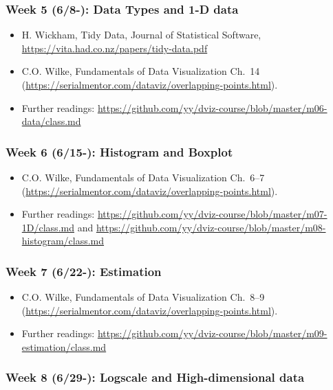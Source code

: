 \documentclass[11pt,article,oneside]{memoir} %
\begin{document}
\subsubsection{Week 5 (6/8-): Data Types and 1-D data } %

\begin{itemize}\itemsep0em 
\item H. Wickham, Tidy Data, Journal of Statistical Software, \url{https://vita.had.co.nz/papers/tidy-data.pdf}
\item C.O. Wilke, Fundamentals of Data Visualization Ch.~14 (\url{https://serialmentor.com/dataviz/overlapping-points.html}). 
\item Further readings: \url{https://github.com/yy/dviz-course/blob/master/m06-data/class.md}
\end{itemize}	
\subsubsection{Week 6 (6/15-): Histogram and Boxplot }%

\begin{itemize}\itemsep0em 
\item C.O. Wilke, Fundamentals of Data Visualization Ch.~6--7 (\url{https://serialmentor.com/dataviz/overlapping-points.html}). 
\item Further readings: \url{https://github.com/yy/dviz-course/blob/master/m07-1D/class.md} and \url{https://github.com/yy/dviz-course/blob/master/m08-histogram/class.md}
\end{itemize}	
\subsubsection{Week 7 (6/22-): Estimation }%

\begin{itemize}\itemsep0em 
\item C.O. Wilke, Fundamentals of Data Visualization Ch.~8--9 (\url{https://serialmentor.com/dataviz/overlapping-points.html}). 
\item Further readings: \url{https://github.com/yy/dviz-course/blob/master/m09-estimation/class.md}
\end{itemize}	
\subsubsection{Week 8 (6/29-): Logscale and High-dimensional data }%
\end{document}
